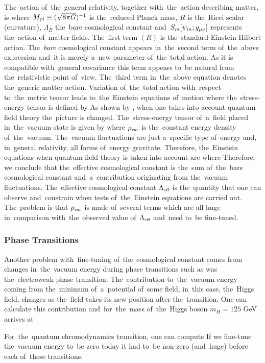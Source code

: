 The~action of~the~general relativity, together with~the~action describing matter, is
where $M_{\text{\scriptsize pl}}\equiv(\sqrt{8\pi G})^{-1}$ is the~reduced Planck mass, $R$ is the~Ricci scalar (curvature), $\Lambda_B$ the~bare cosmological constant and~$S_m[\psi_m;g_{\mu\nu}]$ represents the~action of~matter fields. The~first term $(R)$ is the~standard Einstein-Hilbert action. The~\textit{bare} cosmological constant appears in~the~second term of~the~above expression and~it is merely a~new parameter of~the~total action. As it is compatible with~general covariance this term appears to~be natural from the~relativistic point of~view. The~third term in~the~above equation denotes the~generic matter action. Variation of~the~total action with~respect to~the~metric tensor leads to~the~Einstein equations of~motion
where the~stress-energy tensor is defined by
As shown by \textcite{1968SPhD...12.1040S}, when one takes into account quantum field theory the~picture is changed. The~stress-energy tensor of~a~field placed in~the~vacuum state is given by
where $\rho_\text{\tiny vac}$ is the~constant energy density of~the~vacuum. The~vacuum fluctuations are just a~specific type of~energy and, in~general relativity, all forms of~energy gravitate. Therefore, the~Einstein equations when quantum field theory is taken into account are
where
Therefore, we conclude that the~effective cosmological constant is the~sum of~the~bare cosmological constant and~a~contribution originating from the~vacuum fluctuations. The~effective cosmological constant $\Lambda_\text{\tiny eff}$ is the~quantity that one can observe and~constrain when tests of~the~Einstein equations are carried out. The~problem is that $\rho_\text{\tiny vac}$ is made of~several terms which are all huge in~comparison with~the~observed value of~$\Lambda_\text{\tiny eff}$ and~need to~be fine-tuned.
\subsubsection{Phase Transitions}
\begin{sloppypar}
Another problem with~fine-tuning of~the~cosmological constant comes from changes in~the~vacuum energy during phase transitions such as was the~electroweak phase transition. The~contribution to~the~vacuum energy coming from the~minimum of~a~potential of~some field, in~this case, the~Higgs field, changes as the~field takes its new position after the~transition. One can calculate this contribution \parencite{2012CRPhy..13..566M} and~for~the~mass of~the~Higgs boson $m_H=125$ GeV arrives at
\end{sloppypar}
For~the~quantum chromodynamics transition, one can compute
If we fine-tune the~vacuum energy to~be zero today it had to~be non-zero (and~huge) before each of~these transitions.
